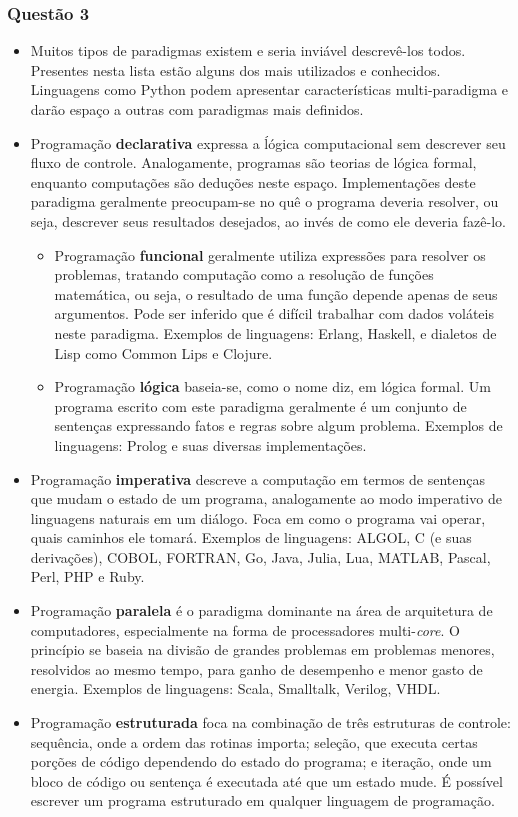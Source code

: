 \documentclass{article}
\begin{document}
\subsubsection*{Questão 3}
\begin{itemize}
\item Muitos tipos de paradigmas existem e seria inviável descrevê-los todos. Presentes nesta lista estão alguns dos mais utilizados e conhecidos. Linguagens como Python podem apresentar características multi-paradigma e darão espaço a outras com paradigmas mais definidos.
\item Programação \textbf{declarativa} expressa a ĺógica computacional sem descrever seu fluxo de controle. Analogamente, programas são teorias de lógica formal, enquanto computações são deduções neste espaço. Implementações deste paradigma geralmente preocupam-se no quê o programa deveria resolver, ou seja, descrever seus resultados desejados, ao invés de como ele deveria fazê-lo.
\begin{itemize}
\item Programação \textbf{funcional} geralmente utiliza expressões para resolver os problemas, tratando computação como a resolução de funções matemática, ou seja, o resultado de uma função depende apenas de seus argumentos. Pode ser inferido que é difícil trabalhar com dados voláteis neste paradigma. Exemplos de linguagens: Erlang, Haskell, e dialetos de Lisp como Common Lips e Clojure.
\item Programação \textbf{lógica} baseia-se, como o nome diz, em lógica formal. Um programa escrito com este paradigma geralmente é um conjunto de sentenças expressando fatos e regras sobre algum problema. Exemplos de linguagens: Prolog e suas diversas implementações.
\end{itemize}
\item Programação \textbf{imperativa} descreve a computação em termos de sentenças que mudam o estado de um programa, analogamente ao modo imperativo de linguagens naturais em um diálogo. Foca em como o programa vai operar, quais caminhos ele tomará. Exemplos de linguagens: ALGOL, C (e suas derivações), COBOL, FORTRAN, Go, Java, Julia, Lua, MATLAB, Pascal, Perl, PHP e Ruby.
\item Programação \textbf{paralela} é o paradigma dominante na área de arquitetura de computadores, especialmente na forma de processadores multi-\textit{core}. O princípio se baseia na divisão de grandes problemas em problemas menores, resolvidos ao mesmo tempo, para ganho de desempenho e menor gasto de energia. Exemplos de linguagens: Scala, Smalltalk, Verilog, VHDL.
\item Programação \textbf{estruturada} foca na combinação de três estruturas de controle: sequência, onde a ordem das rotinas importa; seleção, que executa certas porções de código dependendo do estado do programa; e iteração, onde um bloco de código ou sentença é executada até que um estado mude. É possível escrever um programa estruturado em qualquer linguagem de programação. 
\newpage
\end{itemize}
\end{document}
